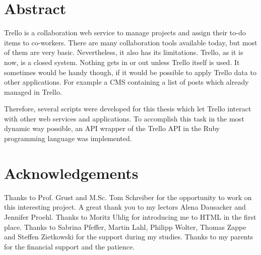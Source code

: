 \documentclass[twoside,12pt,a4paper, parskip=full-]{report}
\begin{document}

\setcounter{page}{1}


\onehalfspacing
\setlength{\parskip}{1ex plus 0.5ex minus 0.2ex}

\section*{Abstract}

Trello is a collaboration web service to manage projects and assign their to-do items to co-workers. There are many collaboration tools available today, but most of them are very basic. Nevertheless, it also has its limitations. Trello, as it is now, is a closed system. Nothing gets in or out unless Trello itself is used. It sometimes would be handy though, if it would be possible to apply Trello data to other applications. For example a CMS containing a list of posts which already managed in Trello.
 
Therefore, several scripts were developed for this thesis which let Trello interact with other web services and applications. To accomplish this task in the most dynamic way possible, an API wrapper of the Trello API in the Ruby programming language was implemented.\\[5mm]

\newpage

\section*{Acknowledgements}
Thanks to Prof. Grust and M.Sc. Tom Schreiber for the opportunity to work on this interesting project. A great thank you to my lectors Alena Dausacker and Jennifer Proehl. Thanks to Moritz Uhlig for introducing me to HTML in the first place. Thanks to Sabrina Pfeffer, Martin Lahl, Philipp Wolter, Thomas Zappe and Steffen Zietkowski for the support during my studies. Thanks to my parents for the financial support and the patience.

\cleardoublepage

\end{document}
